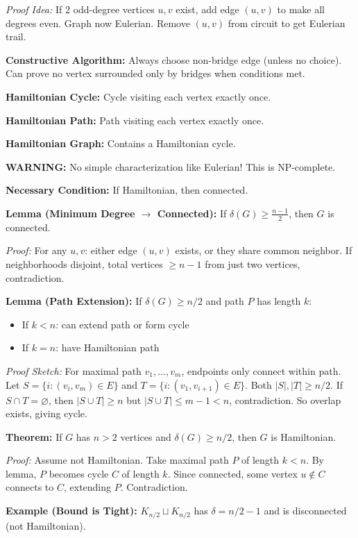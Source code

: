 \documentclass[10pt,landscape]{article}
\begin{document}
\begin{multicols}{3}
\textit{Proof Idea:} If 2 odd-degree vertices $u, v$ exist, add edge $(u,v)$ to make all degrees even. Graph now Eulerian. Remove $(u,v)$ from circuit to get Eulerian trail.

\textbf{Constructive Algorithm:} Always choose non-bridge edge (unless no choice). Can prove no vertex surrounded only by bridges when conditions met.

\textbf{Hamiltonian Cycle:} Cycle visiting each vertex exactly once.

\textbf{Hamiltonian Path:} Path visiting each vertex exactly once.

\textbf{Hamiltonian Graph:} Contains a Hamiltonian cycle.

\textbf{WARNING:} No simple characterization like Eulerian! This is NP-complete.

\textbf{Necessary Condition:} If Hamiltonian, then connected.

\textbf{Lemma (Minimum Degree $\to$ Connected):} If $\delta(G) \geq \frac{n-1}{2}$, then $G$ is connected.

\textit{Proof:} For any $u, v$: either edge $(u,v)$ exists, or they share common neighbor. If neighborhoods disjoint, total vertices $\geq n-1$ from just two vertices, contradiction.

\textbf{Lemma (Path Extension):} If $\delta(G) \geq n/2$ and path $P$ has length $k$:
\begin{itemize}
    \item If $k < n$: can extend path or form cycle
    \item If $k = n$: have Hamiltonian path
\end{itemize}

\textit{Proof Sketch:} For maximal path $v_1, \ldots, v_m$, endpoints only connect within path. Let $S = \{i : (v_i, v_m) \in E\}$ and $T = \{i : (v_1, v_{i+1}) \in E\}$. Both $|S|, |T| \geq n/2$. If $S \cap T = \varnothing$, then $|S \cup T| \geq n$ but $|S \cup T| \leq m-1 < n$, contradiction. So overlap exists, giving cycle.

\textbf{Theorem:} If $G$ has $n > 2$ vertices and $\delta(G) \geq n/2$, then $G$ is Hamiltonian.

\textit{Proof:} Assume not Hamiltonian. Take maximal path $P$ of length $k < n$. By lemma, $P$ becomes cycle $C$ of length $k$. Since connected, some vertex $u \notin C$ connects to $C$, extending $P$. Contradiction.

\textbf{Example (Bound is Tight):} $K_{n/2} \sqcup K_{n/2}$ has $\delta = n/2 - 1$ and is disconnected (not Hamiltonian).


\end{multicols}
\end{document}
